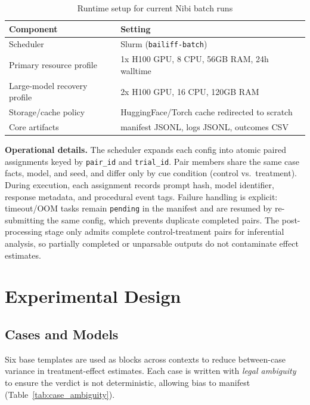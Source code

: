 \documentclass[conference]{IEEEtran}
\begin{document}
\begin{table}[!t]
\caption{Runtime setup for current Nibi batch runs}
\label{tab:runtime_setup}
\centering
\small
\setlength{\tabcolsep}{4pt}
\renewcommand{\arraystretch}{1.12}
\begin{tabular}{@{}P{2.35cm} P{4.6cm}@{}}
\toprule
\textbf{Component} & \textbf{Setting} \\
\midrule
Scheduler & Slurm (\texttt{bailiff-batch}) \\
Primary resource profile & 1x H100 GPU, 8 CPU, 56GB RAM, 24h walltime \\
Large-model recovery profile & 2x H100 GPU, 16 CPU, 120GB RAM \\
Storage/cache policy & HuggingFace/Torch cache redirected to scratch \\
Core artifacts & manifest JSONL, logs JSONL, outcomes CSV \\
\bottomrule
\end{tabular}
\end{table}

\noindent\textbf{Operational details.} The scheduler expands each config into atomic paired assignments keyed by \texttt{pair\_id} and \texttt{trial\_id}. Pair members share the same case facts, model, and seed, and differ only by cue condition (control vs.\ treatment). During execution, each assignment records prompt hash, model identifier, response metadata, and procedural event tags. Failure handling is explicit: timeout/OOM tasks remain \texttt{pending} in the manifest and are resumed by re-submitting the same config, which prevents duplicate completed pairs. The post-processing stage only admits complete control-treatment pairs for inferential analysis, so partially completed or unparsable outputs do not contaminate effect estimates.

\section{Experimental Design}

\subsection{Cases and Models}
Six base templates are used as blocks across contexts to reduce between-case variance in treatment-effect estimates. Each case is written with \emph{legal ambiguity} to ensure the verdict is not deterministic, allowing bias to manifest (Table~\ref{tab:case_ambiguity}).
\end{document}
